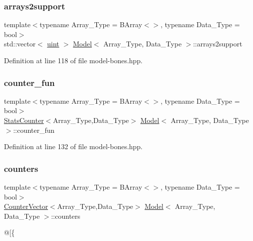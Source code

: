 \subsubsection{\texorpdfstring{arrays2support}{arrays2support}}
{\footnotesize\ttfamily template$<$typename Array\+\_\+\+Type  = B\+Array$<$$>$, typename Data\+\_\+\+Type  = bool$>$ \\
std\+::vector$<$ \hyperlink{typedefs_8hpp_a91ad9478d81a7aaf2593e8d9c3d06a14}{uint} $>$ \hyperlink{class_model}{Model}$<$ Array\+\_\+\+Type, Data\+\_\+\+Type $>$\+::arrays2support}



Definition at line 118 of file model-\/bones.\+hpp.

\mbox{\label{class_model_a126cffe699d64e664ba6aa0b1796c780}} 
\subsubsection{\texorpdfstring{counter\+\_\+fun}{counter\_fun}}
{\footnotesize\ttfamily template$<$typename Array\+\_\+\+Type  = B\+Array$<$$>$, typename Data\+\_\+\+Type  = bool$>$ \\
\hyperlink{class_stats_counter}{Stats\+Counter}$<$Array\+\_\+\+Type,Data\+\_\+\+Type$>$ \hyperlink{class_model}{Model}$<$ Array\+\_\+\+Type, Data\+\_\+\+Type $>$\+::counter\+\_\+fun}



Definition at line 132 of file model-\/bones.\+hpp.

\mbox{\label{class_model_a1a711382ab0593f3b54ad549746e9149}} 
\subsubsection{\texorpdfstring{counters}{counters}}
{\footnotesize\ttfamily template$<$typename Array\+\_\+\+Type  = B\+Array$<$$>$, typename Data\+\_\+\+Type  = bool$>$ \\
\hyperlink{class_counter_vector}{Counter\+Vector}$<$Array\+\_\+\+Type,Data\+\_\+\+Type$>$ \hyperlink{class_model}{Model}$<$ Array\+\_\+\+Type, Data\+\_\+\+Type $>$\+::counters}



@\mbox{[}\{ 



